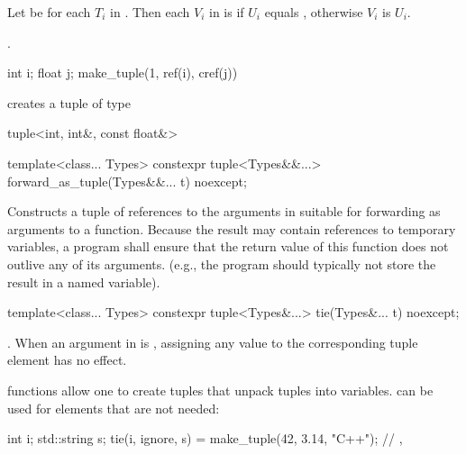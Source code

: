 \begin{itemdescr} \pnum Let  be  for each
$T_i$ in . Then each $V_i$ in  is
 if $U_i$ equals , otherwise
$V_i$ is $U_i$.

\pnum
\returns {}.

\pnum
\begin{example}

\begin{codeblock}
int i; float j;
make_tuple(1, ref(i), cref(j))
\end{codeblock}

creates a tuple of type

\begin{codeblock}
tuple<int, int&, const float&>
\end{codeblock}

\end{example}

\end{itemdescr}

%
%
\begin{itemdecl}
template<class... Types>
  constexpr tuple<Types&&...> forward_as_tuple(Types&&... t) noexcept;
\end{itemdecl}

\begin{itemdescr}
\pnum
\effects Constructs a tuple of references to the arguments in  suitable
for forwarding as arguments to a function. Because the result may contain references
to temporary variables, a program shall ensure that the return value of this
function does not outlive any of its arguments. (e.g., the program should typically
not store the result in a named variable).

\pnum
\returns {}
\end{itemdescr}

%
%
%
\begin{itemdecl}
template<class... Types>
  constexpr tuple<Types&...> tie(Types&... t) noexcept;
\end{itemdecl}

\begin{itemdescr}
\pnum
\returns  {}.  When an
argument in  is , assigning
any value to the corresponding tuple element has no effect.

\pnum
\begin{example}
 functions allow one to create tuples that unpack
tuples into variables.  can be used for elements that
are not needed:
\begin{codeblock}
int i; std::string s;
tie(i, ignore, s) = make_tuple(42, 3.14, "C++");
// , 
\end{codeblock}
\end{example}
\end{itemdescr}

